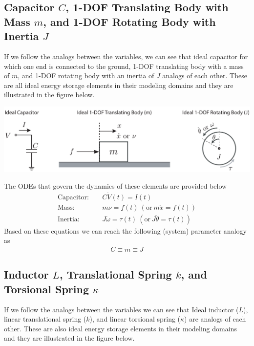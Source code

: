 \documentclass[twoside]{article}
\begin{document}
\subsection{Capacitor $C$, 1-DOF Translating Body with Mass
  $m$, and 1-DOF Rotating Body with Inertia $J$}

If we follow the analogs between the variables, we can see that ideal
capacitor for which one end is connected to the ground, 1-DOF translating body with a mass
of $m$, and 1-DOF rotating body with an inertia of  $J$ analogs of each other. 
These are all ideal energy storage elements in their modeling
domains and they are illustrated in the figure below. 

  \begin{minipage}[h]{0.95\linewidth}
    \begin{center}
      \includegraphics[width=1\textwidth]{cap}
    \end{center}
  \end{minipage}

The ODEs that govern the dynamics of these elements are provided below
%
\begin{align*}
\mathrm{Capacitor:}& \quad C \dot{V}(t) = I(t) \\
\mathrm{Mass:}& \quad  m \dot{\nu} = f(t) \ (\mathrm{or} \ m \ddot{x} =
                f(t) ) \\
\mathrm{Inertia:}& \quad J \dot{\omega} = \tau (t) \ (\mathrm{or} \ J \ddot{\theta} = \tau (t) )
\end{align*}
%
Based on these equations we can reach the following (system) parameter
analogy as
%
\begin{align*}
 C \equiv m \equiv J
\end{align*}
%

\subsection{Inductor $L$, Translational Spring $k$, and Torsional Spring $\kappa$}

If we follow the analogs between the variables we can see that Ideal
inductor ($L$), linear translational spring ($k$), and linear
torsional spring ($\kappa$) are analogs of each other. 
These are also ideal energy storage elements in their modeling
domains and they are illustrated in the figure below. 
\end{document}
